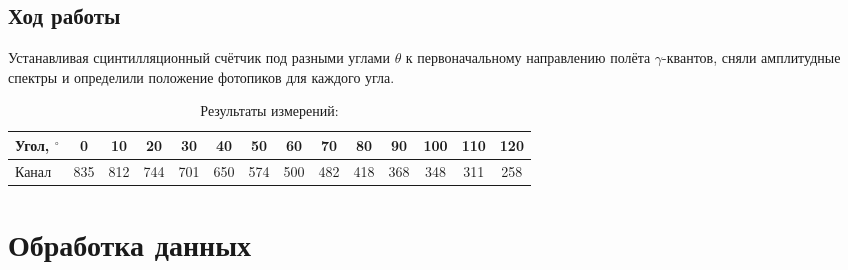 \documentclass[12pt]{article}
\begin{document}
\subsection*{Ход работы}
	Устанавливая сцинтилляционный счётчик под разными углами $\theta$ к первоначальному направлению полёта $\gamma$-квантов, сняли амплитудные спектры и определили положение фотопиков для каждого угла.
	
\begin{table}[h]
\centering
\caption{Результаты измерений:}
\begin{tabular}{|l|c|c|c|c|c|c|c|c|c|c|c|c|c|}
\hline
Угол, $^\circ$ &0 & 10 & 20 & 30 & 40 & 50 & 60 & 70& 80& 90 &100& 110 &120\\ \hline
Канал & 835 & 812& 744 & 701 & 650 & 574 & 500 & 482 & 418 & 368 & 348 & 311 & 258 \\ \hline
\end{tabular}
\end{table}		
\section*{Обработка данных}
\end{document}
